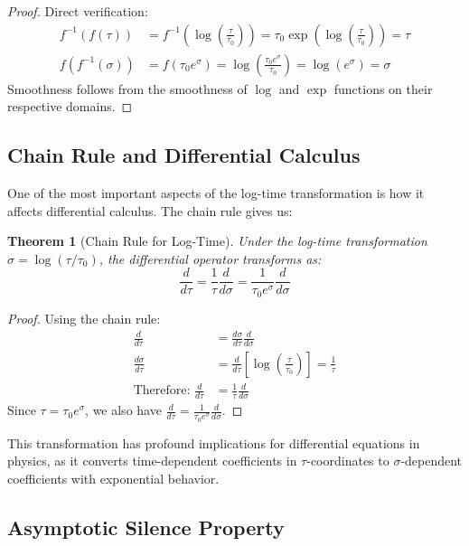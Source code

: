 \documentclass[11pt,a4paper]{article}
\newtheorem{theorem}{Theorem}[section]
\begin{document}
\begin{proof}
Direct verification:
\begin{align}
f^{-1}(f(\tau)) &= f^{-1}\left(\log\left(\frac{\tau}{\tau_0}\right)\right) = \tau_0 \exp\left(\log\left(\frac{\tau}{\tau_0}\right)\right) = \tau \\
f(f^{-1}(\sigma)) &= f(\tau_0 e^{\sigma}) = \log\left(\frac{\tau_0 e^{\sigma}}{\tau_0}\right) = \log(e^{\sigma}) = \sigma
\end{align}
Smoothness follows from the smoothness of $\log$ and $\exp$ functions on their respective domains.
\end{proof}

\subsection{Chain Rule and Differential Calculus}

One of the most important aspects of the log-time transformation is how it affects differential calculus. The chain rule gives us:

\begin{theorem}[Chain Rule for Log-Time]
Under the log-time transformation $\sigma = \log(\tau/\tau_0)$, the differential operator transforms as:
\begin{equation}
\frac{d}{d\tau} = \frac{1}{\tau} \frac{d}{d\sigma} = \frac{1}{\tau_0 e^{\sigma}} \frac{d}{d\sigma}
\end{equation}
\end{theorem}

\begin{proof}
Using the chain rule:
\begin{align}
\frac{d}{d\tau} &= \frac{d\sigma}{d\tau} \frac{d}{d\sigma} \\
\frac{d\sigma}{d\tau} &= \frac{d}{d\tau}\left[\log\left(\frac{\tau}{\tau_0}\right)\right] = \frac{1}{\tau} \\
\text{Therefore: } \frac{d}{d\tau} &= \frac{1}{\tau} \frac{d}{d\sigma}
\end{align}
Since $\tau = \tau_0 e^{\sigma}$, we also have $\frac{d}{d\tau} = \frac{1}{\tau_0 e^{\sigma}} \frac{d}{d\sigma}$.
\end{proof}

This transformation has profound implications for differential equations in physics, as it converts time-dependent coefficients in $\tau$-coordinates to $\sigma$-dependent coefficients with exponential behavior.

\subsection{Asymptotic Silence Property}
\end{document}
